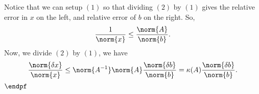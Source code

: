 \documentclass{report}
\begin{document}
    Notice that we can setup $(1)$ so that dividing $(2)$ by $(1)$ gives the relative error in $x$ on the left, and relative error of $b$ on the right. So,
    \begin{align*}
        \frac{1}{\norm{x}} \leq \frac{\norm{A}}{\norm{b}}
    .\end{align*}
    Now, we divide $(2)$ by $(1)$, we have
    \begin{align*}
        \frac{\norm{\delta x}}{\norm{x}} \leq \norm{A^{-1}}\norm{A} \frac{\norm{ \delta  b}}{\norm{b}} = \kappa(A)\frac{\norm{\delta b}}{\norm{b}}
    .\end{align*}
    $\endpf $

    
\end{document}
